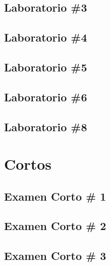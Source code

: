\documentclass[openany]{book}
\begin{document}
\chapter{Laboratorio \#3}



\chapter{Laboratorio \#4}



\chapter{Laboratorio \#5}


\chapter{Laboratorio \#6}


\chapter{Laboratorio \#8}






\part{Cortos}
\chapter{Examen Corto \# 1}



\chapter{Examen Corto \# 2}


\chapter{Examen Corto \# 3}

\end{document}
